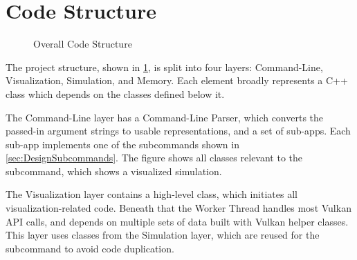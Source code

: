 \section{Code Structure}
\begin{figure}
    \centering
    \caption{Overall Code Structure}
    \label{fig:designstructure}
\end{figure}
The project structure, shown in \cref{fig:designstructure}, is split into four layers: Command-Line, Visualization, Simulation, and Memory.
Each element broadly represents a C++ class which depends on the classes defined below it.

The Command-Line layer has a Command-Line Parser, which converts the passed-in argument strings to usable representations, and a set of sub-apps.
Each sub-app implements one of the subcommands shown in \cref{sec:DesignSubcommands}.
The figure shows all classes relevant to the  subcommand, which shows a visualized simulation.

The Visualization layer contains a high-level  class, which initiates all visualization-related code.
Beneath that the Worker Thread handles most Vulkan API calls, and depends on multiple sets of data built with Vulkan helper classes.
This layer uses classes from the Simulation layer, which are reused for the  subcommand to avoid code duplication.

